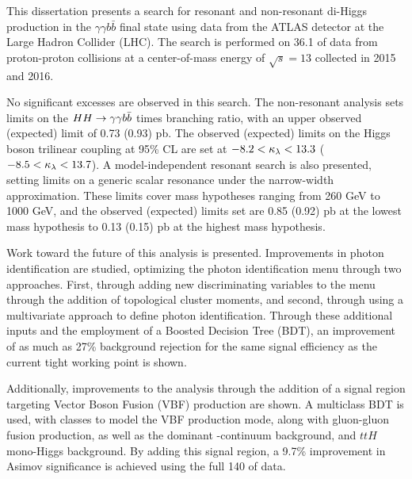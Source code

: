 This dissertation presents a search for resonant and non-resonant di-Higgs production in the $\gamma \gamma b \bar{b}$ final state using data from the ATLAS detector at the Large Hadron Collider (LHC).  The search is performed on 36.1 \ifb of data from proton-proton collisions at a center-of-mass energy of $\sqrt{s} = 13$ \TeV collected in 2015 and 2016.

No significant excesses are observed in this search. The non-resonant analysis sets limits on the $HH\rightarrow\gamma\gamma b\bar{b}$ \xsec times branching ratio, with an upper observed (expected) limit of 0.73 (0.93) pb. The observed (expected) limits on the Higgs boson trilinear coupling at 95\% \gls{CL} are set at $-8.2 < \kappa_{\lambda} < 13.3$ ($-8.5 < \kappa_{\lambda} < 13.7$). A model-independent resonant search is also presented, setting limits on a generic scalar resonance under the narrow-width approximation. These limits cover mass hypotheses ranging from 260 GeV to 1000 GeV, and the observed (expected) limits set are 0.85 (0.92) pb at the lowest mass hypothesis to 0.13 (0.15) pb at the highest mass hypothesis.

Work toward the future of this analysis is presented. Improvements in photon identification are studied, optimizing the photon identification menu through two approaches. First, through adding new discriminating variables to the menu through the addition of topological cluster moments, and second, through using a multivariate approach to define photon identification. Through these additional inputs and the employment of a Boosted Decision Tree (BDT), an improvement of as much as 27\% background rejection for the same signal efficiency as the current tight working point is shown.

Additionally, improvements to the analysis through the addition of a signal region targeting Vector Boson Fusion (VBF) production are shown. A multiclass BDT is used, with classes to model the VBF \hh production mode, along with gluon-gluon fusion \hh production, as well as the dominant \yy-continuum background, and $ttH$ mono-Higgs background. By adding this signal region, a 9.7\% improvement in Asimov significance is achieved using the full 140 \ifb of \RunTwo data. 